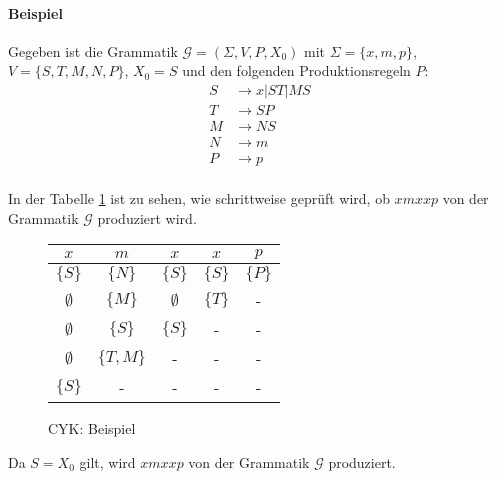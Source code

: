         \paragraph{Beispiel}
            Gegeben ist die Grammatik $ \mathcal{G} = (\Sigma, V, P, X _ 0) $ mit $ \Sigma = \{ x, m, p \} $, $ V = \{ S, T, M, N, P \} $, $ X _ 0 = S $ und den folgenden Produktionsregeln $ P $:
            \begin{equation*}
                \begin{split}
                    S & \rightarrow x | ST | MS \\
                    T & \rightarrow SP          \\
                    M & \rightarrow NS          \\
                    N & \rightarrow m           \\
                    P & \rightarrow p           \\
                \end{split}
            \end{equation*}

            In der Tabelle \ref{cyk:beispiel} ist zu sehen, wie schrittweise geprüft wird, ob $ xmxxp $ von der Grammatik $ \mathcal{G} $ produziert wird.
            \begin{figure}[ht]
                \label{cyk:beispiel}
                \centering
                \begin{tabular}{c | c | c | c | c}
                    $ x $         & $ m $          & $ x $         & $ x $         & $ p $     \\
                    \hline
                    $ \{ S \}   $ & $ \{ N \} $    & $ \{ S \} $   & $ \{ S \} $ & $ \{ P \} $ \\
                    $ \emptyset $ & $ \{ M \} $    & $ \emptyset $ & $ \{ T \} $ & -           \\
                    $ \emptyset $ & $ \{ S \} $    & $ \{ S \} $   & -           & -           \\
                    $ \emptyset $ & $ \{ T, M \} $ & -             & -           & -           \\
                    $ \{ S \} $   & -              & -             & -           & -           \\
                \end{tabular}
                \caption{CYK: Beispiel}
            \end{figure}
            Da $ S = X _ 0 $ gilt, wird $ xmxxp $ von der Grammatik $ \mathcal{G} $ produziert.


